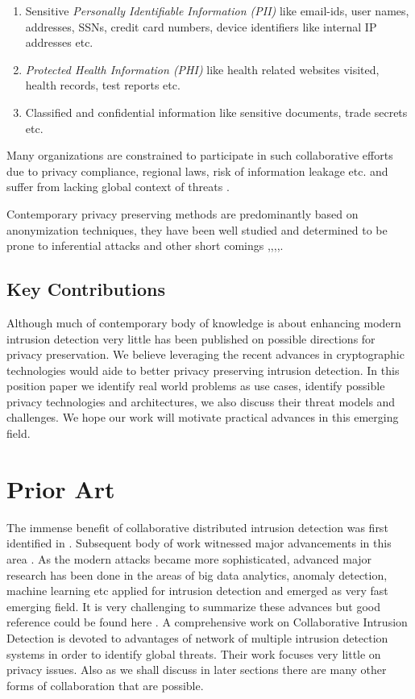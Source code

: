 \documentclass[runningheads,a4paper]{llncs}
\begin{document}
\begin{enumerate}
\item Sensitive \emph{Personally Identifiable Information (PII)} like email-ids, user names, addresses, SSNs, credit card numbers, device identifiers like internal IP addresses etc.
\item \emph{Protected Health Information (PHI)} like health related websites visited, health records, test reports etc.
\item Classified and confidential information like sensitive documents, trade secrets etc.  
\end{enumerate}
Many organizations are constrained to participate in such collaborative efforts due to privacy compliance, regional laws, risk of information leakage etc. and suffer from lacking global context of threats \cite{rsareport}.

Contemporary privacy preserving methods are predominantly based on  anonymization techniques,  they have been well studied and determined to be prone to inferential attacks and other short comings \cite{pang2006devil},\cite{coull2008taming},\cite{king2009taxonomy},\cite{li2009tradeoff},\cite{brekne2005circumventing}.

\subsection{ Key Contributions}
Although much of contemporary body of knowledge is about enhancing modern intrusion detection very little has been published on possible directions for privacy preservation. We believe leveraging the recent advances in cryptographic technologies would aide to better privacy preserving intrusion detection. In this position paper we identify real world problems as use cases, identify possible privacy technologies and architectures, we also discuss their threat models and challenges. We hope our work will motivate practical advances in this emerging field.
\section{Prior Art}
The immense benefit of collaborative distributed intrusion detection was first identified in \cite{locasto2004collaborative}. Subsequent body of work witnessed major advancements in this area \cite{zhou2010survey}.  As the modern attacks became more sophisticated, advanced major research has been done in the areas of big data analytics, anomaly detection, machine learning etc applied for intrusion detection and emerged as very fast emerging field. It is very challenging to summarize these advances but good reference could be found here \cite{suthaharan2014big}. A comprehensive work on Collaborative Intrusion Detection is devoted to advantages of network of multiple intrusion detection systems in order to identify global threats\cite{fung2013intrusion}. Their work focuses very little on privacy issues. Also as we shall discuss in later sections there are many other forms of collaboration that are possible.
\end{document}
